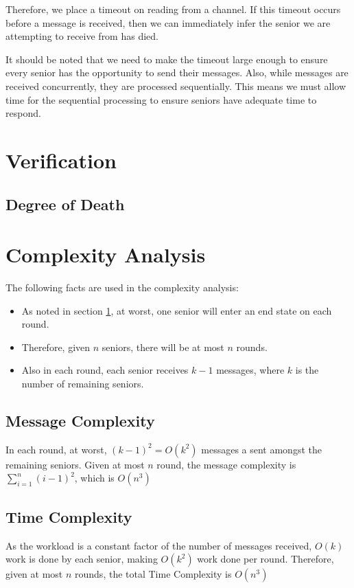 \documentclass[12pt,a4paper]{scrartcl}
\begin{document}
Therefore, we place a timeout on reading from a channel.
If this timeout occurs before a message is received, then we can immediately infer the senior we are attempting to receive from has died.

It should be noted that we need to make the timeout large enough to ensure every senior has the opportunity to send their messages.
Also, while messages are received concurrently, they are processed sequentially.
This means we must allow time for the sequential processing to ensure seniors have adequate time to respond.

\section{Verification}
\label{sec:verification}

\subsection{Degree of Death}

\section{Complexity Analysis}
The following facts are used in the complexity analysis:
\begin{itemize}
    \item As noted in section \ref{sec:verification}, at worst, one senior will enter an end state on each round.
    \item Therefore, given $n$ seniors, there will be at most $n$ rounds.
    \item Also in each round, each senior receives $k-1$ messages, where $k$ is the number of remaining seniors.
\end{itemize}

\subsection{Message Complexity}
In each round, at worst, $(k-1)^2 = O(k^2)$ messages a sent amongst the remaining seniors.
Given at most $n$ round, the message complexity is $\sum_{i=1}^n (i-1)^2$, which is $O(n^3)$

\subsection{Time Complexity}
As the workload is a constant factor of the number of messages received, $O(k)$ work is done by each senior, making $O(k^2)$ work done per round.
Therefore, given at most $n$ rounds, the total Time Complexity is $O(n^3)$
\end{document}
